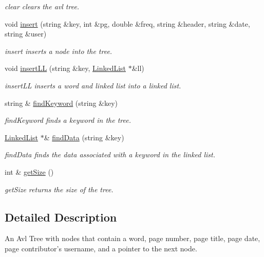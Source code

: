 \begin{DoxyCompactItemize}
\begin{DoxyCompactList}\small\item\em clear clears the avl tree. \end{DoxyCompactList}\item 
void \hyperlink{class_avl_tree_a9305ea46f35f021ddf30bbc87c071f30}{insert} (string \&key, int \&pg, double \&freq, string \&header, string \&date, string \&user)
\begin{DoxyCompactList}\small\item\em insert inserts a node into the tree. \end{DoxyCompactList}\item 
void \hyperlink{class_avl_tree_a82a02d204f4067ff89e0fb6925d58893}{insert\-L\-L} (string \&key, \hyperlink{class_linked_list}{Linked\-List} $\ast$\&ll)
\begin{DoxyCompactList}\small\item\em insert\-L\-L inserts a word and linked list into a linked list. \end{DoxyCompactList}\item 
string \& \hyperlink{class_avl_tree_ad2eb1d8582a66fd6fe3af126466aff19}{find\-Keyword} (string \&key)
\begin{DoxyCompactList}\small\item\em find\-Keyword finds a keyword in the tree. \end{DoxyCompactList}\item 
\hyperlink{class_linked_list}{Linked\-List} $\ast$\& \hyperlink{class_avl_tree_a60f76637184e51d2e78c8935ef14aea7}{find\-Data} (string \&key)
\begin{DoxyCompactList}\small\item\em find\-Data finds the data associated with a keyword in the linked list. \end{DoxyCompactList}\item 
int \& \hyperlink{class_avl_tree_a1821114e5e9ef3a482d601d11561853c}{get\-Size} ()
\begin{DoxyCompactList}\small\item\em get\-Size returns the size of the tree. \end{DoxyCompactList}\end{DoxyCompactItemize}


\subsection{Detailed Description}
An Avl Tree with nodes that contain a word, page number, page title, page date, page contributor's username, and a pointer to the next node. 

